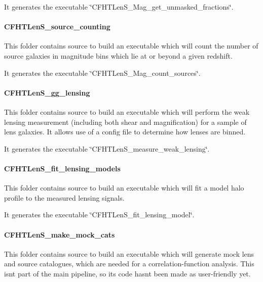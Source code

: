 It generates the executable \char`\"{}\+C\+F\+H\+T\+Len\+S\+\_\+\+Mag\+\_\+get\+\_\+unmasked\+\_\+fractions\char`\"{}.

\paragraph*{C\+F\+H\+T\+Len\+S\+\_\+source\+\_\+counting}

This folder contains source to build an executable which will count the number of source galaxies in magnitude bins which lie at or beyond a given redshift.

It generates the executable \char`\"{}\+C\+F\+H\+T\+Len\+S\+\_\+\+Mag\+\_\+count\+\_\+sources\char`\"{}.

\paragraph*{C\+F\+H\+T\+Len\+S\+\_\+gg\+\_\+lensing}

This folder contains source to build an executable which will perform the weak lensing measurement (including both shear and magnification) for a sample of lens galaxies. It allows use of a config file to determine how lenses are binned.

It generates the executable \char`\"{}\+C\+F\+H\+T\+Len\+S\+\_\+measure\+\_\+weak\+\_\+lensing\char`\"{}.

\paragraph*{C\+F\+H\+T\+Len\+S\+\_\+fit\+\_\+lensing\+\_\+models}

This folder contains source to build an executable which will fit a model halo profile to the measured lensing signals.

It generates the executable \char`\"{}\+C\+F\+H\+T\+Len\+S\+\_\+fit\+\_\+lensing\+\_\+model\char`\"{}.

\paragraph*{C\+F\+H\+T\+Len\+S\+\_\+make\+\_\+mock\+\_\+cats}

This folder contains source to build an executable which will generate mock lens and source catalogues, which are needed for a correlation-\/function analysis. This isn\textquotesingle{}t part of the main pipeline, so its code hasn\textquotesingle{}t been made as user-\/friendly yet.

